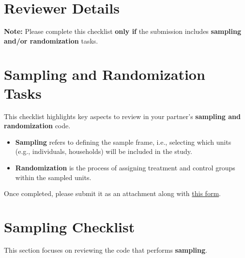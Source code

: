 \documentclass{tufte-handout}
\begin{document}
\thispagestyle{firstpage}

    \begin{fullwidth}
		

        \section*{Reviewer Details}
		
	\vspace{0.5cm}

        \textbf{Note:} Please complete this checklist \textbf{only if} the submission includes \textbf{sampling and/or randomization} tasks.
		
\section*{Sampling and Randomization Tasks}
This checklist highlights key aspects to review in your partner's \textbf{sampling and randomization} code.  
\begin{itemize}
    \item \textbf{Sampling} refers to defining the sample frame, i.e., selecting which units (e.g., individuals, households) will be included in the study.
    \item \textbf{Randomization} is the process of assigning treatment and control groups within the sampled units.
\end{itemize}
Once completed, please submit it as an attachment along with \href{https://survey.wb.surveycto.com/collect/code_review_summary?caseid=}{this form}.


\section*{Sampling Checklist}
This section focuses on reviewing the code that performs \textbf{sampling}.


\end{fullwidth}
\end{document}
